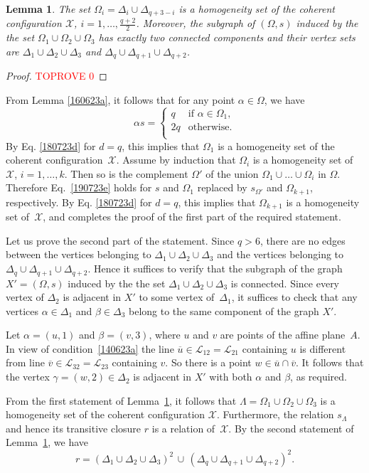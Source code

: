\documentclass{amsart}
\newcommand{\cal}{\mathcal}
\newtheorem{lemma}[formula]{Lemma}
\def\qtnl#1{\begin{equation}\label{#1}}
\def\eqtn{\end{equation}}
\def\lmml#1{\begin{lemma}\label{#1}}
\def\elmm{\end{lemma}}
\def\css{\begin{cases}}
\def\ecss{\end{cases}}
\def\prf{\begin{proof}\textcolor{red}{TOPROVE 0}\end{proof}}
\def\cL{{\cal L}}
\def\cX{{\cal X}}
\def\ov{\overline}
\begin{document}
\lmml{160623b}
The set $\Omega_i=\Delta_i\cup\Delta_{q+3-i}$ is a homogeneity set of the coherent configuration $\cX$, $i=1,\ldots,\frac{q+2}{2}$.  Moreover, the subgraph of $(\Omega,s)$ induced by the the set $\Omega_1\cup\Omega_2\cup\Omega_3$ has exactly two connected components and their vertex sets are $\Delta_1\cup \Delta_2\cup\Delta_3$ and $\Delta_q\cup\Delta_{q+1}\cup \Delta_{q+2}$. 
\elmm
\prf
From Lemma \ref{160623a}, it follows that for any point $\alpha\in\Omega$, we have  
\qtnl{190723e}
\alpha s=\css
q  &\text{if $\alpha\in\Omega_1$},\\
2q &\text{otherwise.}\\
\ecss
\eqtn
By Eq. \eqref{180723d} for $d=q$, this implies that $\Omega_1$ is a homogeneity set of the coherent configuration~$\cX$. Assume by  induction that $\Omega_i$ is a homogeneity set of~$\cX$, $i=1,\ldots,k$. Then so is the complement $\Omega'$ of the union $\Omega_1\cup\ldots\cup\Omega_i$ in $\Omega$.   Therefore Eq.~\eqref{190723e} holds for $s$ and  $\Omega_1$ replaced by $s_{\Omega'}$ and $\Omega_{k+1}$, respectively. 
By Eq. \eqref{180723d} for $d=q$, this implies that $\Omega_{k+1}$ is a homogeneity set of~$\cX$, and completes the proof of the first part of the required statement. 

Let us prove the second part of the statement. Since $q>6$, there are no edges between the vertices belonging to $\Delta_1\cup \Delta_2\cup\Delta_3$ and  the vertices belonging to  $\Delta_q\cup\Delta_{q+1}\cup \Delta_{q+2}$. Hence it suffices to verify that the subgraph of the graph $X'=(\Omega,s)$ induced by the the set $\Delta_1\cup \Delta_2\cup\Delta_3$ is connected. Since every vertex of $\Delta_2$ is adjacent in  $X'$ to some vertex of~$\Delta_1$, it suffices to check that any vertices $\alpha\in\Delta_1$ and $\beta\in\Delta_3$ belong to the same component of the graph $X'$.

Let $\alpha=(u,1)$ and $\beta=(v,3)$, where $u$ and $v$ are points of the affine plane~$A$. In view of condition~\eqref{140623a}  the line $\ov u\in\cL_{12}=\cL_{21}$ containing $u$ is different from line $\ov v\in\cL_{32}=\cL_{23}$ containing $v$. So there is a point $w\in \ov u\cap\ov v$. It follows that the vertex $\gamma=(w,2)\in\Delta_2$ is adjacent in $X'$ with both $\alpha$ and $\beta$, as required.
\eprf

From the first statement of Lemma~\ref{160623b}, it follows that $\Lambda=\Omega_1\cup\Omega_2\cup\Omega_3$ is a homogeneity set of the coherent configuration $\cX$. Furthermore, the relation $s_\Lambda$ and hence its  transitive closure $r$  is a relation of~$\cX$. By the second statement of Lemma~\ref{160623b}, we have 
$$
r=(\Delta_1\cup \Delta_2\cup\Delta_3)^2\,\cup\,(\Delta_q\cup\Delta_{q+1}\cup \Delta_{q+2})^2.
$$
\end{document}
